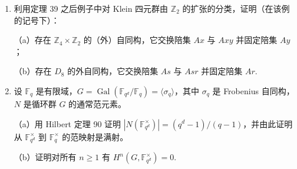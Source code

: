 \begin{enumerate}
\item 利用定理 39 之后例子中对 Klein 四元群由 \(\mathbb{Z}_2\) 的扩张的分类，证明（在该例的记号下）：

（a）存在 \(\mathbb{Z}_4 \times \mathbb{Z}_2\) 的（外）自同构，它交换陪集 \(Ax\) 与 \(Axy\) 并固定陪集 \(Ay\)；

（b）存在 \(D_8\) 的外自同构，它交换陪集 \(As\) 与 \(Asr\) 并固定陪集 \(Ar\).

\item 设 \(\mathbb{F}_q\) 是有限域，\(G = \operatorname{Gal}(\mathbb{F}_{q^d}/\mathbb{F}_q) = \langle\sigma_q\rangle\)，其中 \(\sigma_q\) 是 Frobenius 自同构，\(N\) 是循环群 \(G\) 的通常范元素。

（a）用 Hilbert 定理 90 证明 \(|N(\mathbb{F}_{q^d}^\times)| = (q^d-1)/(q-1)\)，并由此证明从 \(\mathbb{F}_{q^d}^\times\) 到 \(\mathbb{F}_q^\times\) 的范映射是满射。

（b）证明对所有 \(n \geq 1\) 有 \(H^n(G, \mathbb{F}_{q^d}^\times) = 0\).
\end{enumerate}
